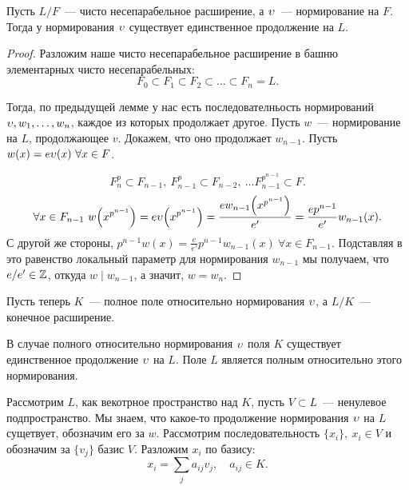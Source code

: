  	\begin{lemma} 
 		Пусть $L/F$~--- чисто несепарабельное расширение, а $\upsilon$~--- нормирование на $F$. Тогда у нормирования $\upsilon$ существует единственное продолжение на $L$.
 	\end{lemma}
 	\begin{proof}
 		Разложим наше чисто несепарабельное расширение в башню элементарных чисто несепарабельных: 
 		\[
 			F_0 \subset F_1 \subset F_2 \subset \ldots \subset F_n = L.
 		\]

 		Тогда, по предыдущей лемме у нас есть последователньость нормирований $\upsilon, w_1, \ldots, w_n$, каждое из которых продолжает другое. Пусть $w$~--- нормирование на $L$, продолжающее $v$. Докажем, что оно продолжает $w_{n - 1}$. Пусть $w(x) = e\upsilon(x) \ \forall x \in F$. 

 		\[
 			F_n^{p} \subset F_{n - 1}, \ F_{n - 1}^{p} \subset F_{n - 2}, \ \ldots F_{n - 1}^{p^{n - 1}} \subset F.
 		\]
 		\[ 
 		\forall x \in F_{n - 1} \ w\lr*{x^{p^{n - 1}}} = e\v\lr*{x^{p^{n - 1}}} = \frac{e w_{n - 1}\lr*{x^{p^{n - 1}}}}{e'} = \frac{e p^{n - 1}}{e'} w_{n - 1}(x).
 		\]
 		С другой же стороны, $p^{n - 1}w(x) = \frac{e}{e'} p^{n - 1}w_{n - 1}(x) \ \forall x \in F_{n - 1}$. Подставляя в это равенство локальный параметр для нормирования $w_{n - 1}$ мы получаем, что $e/e' \in \mathbb{Z}$, откуда $w \mid w_{n - 1}$, а значит, $w = w_{n}$.
 	\end{proof}

 	Пусть теперь $K$~--- полное поле относительно нормирования $\upsilon$, а $L/K$~--- конечное расширение. 

 	\begin{theorem} 
 		В случае полного относительно нормирования $\upsilon$ поля $K$ существует единственное продолжение $\upsilon$ на $L$. Поле $L$ является полным относительно этого нормирования. 
 	\end{theorem}

 	Рассмотрим $L$, как векотрное пространство над $K$, пусть $V \subset L$~--- ненулевое подпространство. Мы знаем, что какое-то продолжение нормирования $\upsilon$ на $L$ сущетвует, обозначим его за $w$. Рассмотрим последовательность  $\{ x_i \}, \ x_i \in V$ и обозначим за $\{ v_j \}$  базис $V$. Разложим $x_i$ по базису: 
 	\[
 		x_i = \sum_{j} a_{i j} v_{j}, \quad a_{i j} \in K.
 	\]

